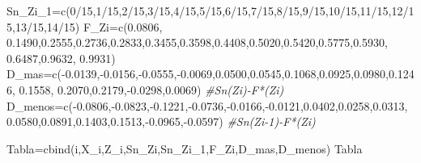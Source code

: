 \documentclass[
  a4paper,
  oneside,
  openany]{book}
\newenvironment{Shaded}{\begin{snugshade}}{\end{snugshade}}
\newcommand{\CommentTok}[1]{\textcolor[rgb]{0.56,0.35,0.01}{\textit{#1}}}
\newcommand{\DecValTok}[1]{\textcolor[rgb]{0.00,0.00,0.81}{#1}}
\newcommand{\FloatTok}[1]{\textcolor[rgb]{0.00,0.00,0.81}{#1}}
\newcommand{\FunctionTok}[1]{\textcolor[rgb]{0.00,0.00,0.00}{#1}}
\newcommand{\NormalTok}[1]{#1}
\newcommand{\OtherTok}[1]{\textcolor[rgb]{0.56,0.35,0.01}{#1}}
\newcommand{\SpecialCharTok}[1]{\textcolor[rgb]{0.00,0.00,0.00}{#1}}
\begin{document}
\begin{Shaded}
\begin{Highlighting}[]
\NormalTok{Sn\_Zi\_1}\OtherTok{=}\FunctionTok{c}\NormalTok{(}\DecValTok{0}\SpecialCharTok{/}\DecValTok{15}\NormalTok{,}\DecValTok{1}\SpecialCharTok{/}\DecValTok{15}\NormalTok{,}\DecValTok{2}\SpecialCharTok{/}\DecValTok{15}\NormalTok{,}\DecValTok{3}\SpecialCharTok{/}\DecValTok{15}\NormalTok{,}\DecValTok{4}\SpecialCharTok{/}\DecValTok{15}\NormalTok{,}\DecValTok{5}\SpecialCharTok{/}\DecValTok{15}\NormalTok{,}\DecValTok{6}\SpecialCharTok{/}\DecValTok{15}\NormalTok{,}\DecValTok{7}\SpecialCharTok{/}\DecValTok{15}\NormalTok{,}\DecValTok{8}\SpecialCharTok{/}\DecValTok{15}\NormalTok{,}\DecValTok{9}\SpecialCharTok{/}\DecValTok{15}\NormalTok{,}\DecValTok{10}\SpecialCharTok{/}\DecValTok{15}\NormalTok{,}\DecValTok{11}\SpecialCharTok{/}\DecValTok{15}\NormalTok{,}\DecValTok{12}\SpecialCharTok{/}\DecValTok{15}\NormalTok{,}\DecValTok{13}\SpecialCharTok{/}\DecValTok{15}\NormalTok{,}\DecValTok{14}\SpecialCharTok{/}\DecValTok{15}\NormalTok{)}
\NormalTok{F\_Zi}\OtherTok{=}\FunctionTok{c}\NormalTok{(}\FloatTok{0.0806}\NormalTok{, }\FloatTok{0.1490}\NormalTok{,}\FloatTok{0.2555}\NormalTok{,}\FloatTok{0.2736}\NormalTok{,}\FloatTok{0.2833}\NormalTok{,}\FloatTok{0.3455}\NormalTok{,}\FloatTok{0.3598}\NormalTok{,}\FloatTok{0.4408}\NormalTok{,}\FloatTok{0.5020}\NormalTok{,}\FloatTok{0.5420}\NormalTok{,}\FloatTok{0.5775}\NormalTok{,}\FloatTok{0.5930}\NormalTok{,}
       \FloatTok{0.6487}\NormalTok{,}\FloatTok{0.9632}\NormalTok{, }\FloatTok{0.9931}\NormalTok{)}
\NormalTok{D\_mas}\OtherTok{=}\FunctionTok{c}\NormalTok{(}\SpecialCharTok{{-}}\FloatTok{0.0139}\NormalTok{,}\SpecialCharTok{{-}}\FloatTok{0.0156}\NormalTok{,}\SpecialCharTok{{-}}\FloatTok{0.0555}\NormalTok{,}\SpecialCharTok{{-}}\FloatTok{0.0069}\NormalTok{,}\FloatTok{0.0500}\NormalTok{,}\FloatTok{0.0545}\NormalTok{,}\FloatTok{0.1068}\NormalTok{,}\FloatTok{0.0925}\NormalTok{,}\FloatTok{0.0980}\NormalTok{,}\FloatTok{0.1246}\NormalTok{, }\FloatTok{0.1558}\NormalTok{,}
        \FloatTok{0.2070}\NormalTok{,}\FloatTok{0.2179}\NormalTok{,}\SpecialCharTok{{-}}\FloatTok{0.0298}\NormalTok{,}\FloatTok{0.0069}\NormalTok{)    }\CommentTok{\#Sn(Zi){-}F*(Zi)}
\NormalTok{D\_menos}\OtherTok{=}\FunctionTok{c}\NormalTok{(}\SpecialCharTok{{-}}\FloatTok{0.0806}\NormalTok{,}\SpecialCharTok{{-}}\FloatTok{0.0823}\NormalTok{,}\SpecialCharTok{{-}}\FloatTok{0.1221}\NormalTok{,}\SpecialCharTok{{-}}\FloatTok{0.0736}\NormalTok{,}\SpecialCharTok{{-}}\FloatTok{0.0166}\NormalTok{,}\SpecialCharTok{{-}}\FloatTok{0.0121}\NormalTok{,}\FloatTok{0.0402}\NormalTok{,}\FloatTok{0.0258}\NormalTok{,}\FloatTok{0.0313}\NormalTok{, }
          \FloatTok{0.0580}\NormalTok{,}\FloatTok{0.0891}\NormalTok{,}\FloatTok{0.1403}\NormalTok{,}\FloatTok{0.1513}\NormalTok{,}\SpecialCharTok{{-}}\FloatTok{0.0965}\NormalTok{,}\SpecialCharTok{{-}}\FloatTok{0.0597}\NormalTok{)   }\CommentTok{\#Sn(Zi{-}1){-}F*(Zi)}

\NormalTok{Tabla}\OtherTok{=}\FunctionTok{cbind}\NormalTok{(i,X\_i,Z\_i,Sn\_Zi,Sn\_Zi\_1,F\_Zi,D\_mas,D\_menos)}
\NormalTok{Tabla}
\end{Highlighting}
\end{Shaded}
\end{document}
